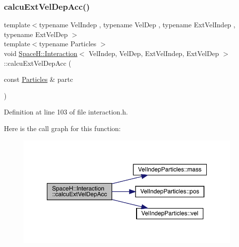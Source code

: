 \subsubsection{\texorpdfstring{calcu\+Ext\+Vel\+Dep\+Acc()}{calcuExtVelDepAcc()}}
{\footnotesize\ttfamily template$<$typename Vel\+Indep , typename Vel\+Dep , typename Ext\+Vel\+Indep , typename Ext\+Vel\+Dep $>$ \\
template$<$typename Particles $>$ \\
void \mbox{\hyperlink{class_space_h_1_1_interaction}{Space\+H\+::\+Interaction}}$<$ Vel\+Indep, Vel\+Dep, Ext\+Vel\+Indep, Ext\+Vel\+Dep $>$\+::calcu\+Ext\+Vel\+Dep\+Acc (\begin{DoxyParamCaption}\item[{const \mbox{\hyperlink{struct_particles}{Particles}} \&}]{partc }\end{DoxyParamCaption})\hspace{0.3cm}{\ttfamily [inline]}}



Definition at line 103 of file interaction.\+h.

Here is the call graph for this function\+:\nopagebreak
\begin{figure}[H]
\begin{center}
\leavevmode
\includegraphics[width=347pt]{class_space_h_1_1_interaction_a171fc6ed61d1e4d842df56d150c5d2ca_cgraph}
\end{center}
\end{figure}
\mbox{\label{class_space_h_1_1_interaction_a1121ca910c3c919b9239ed57ecb79440}} 
